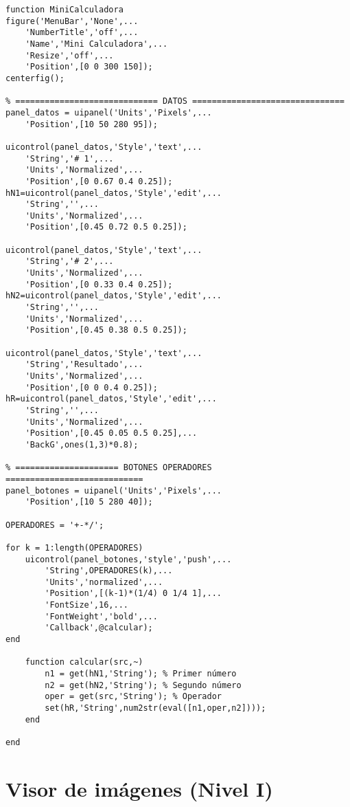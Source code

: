 \begin{verbatim}
function MiniCalculadora
figure('MenuBar','None',...
    'NumberTitle','off',...
    'Name','Mini Calculadora',...
    'Resize','off',...
    'Position',[0 0 300 150]);
centerfig();
 
% ============================= DATOS ===============================
panel_datos = uipanel('Units','Pixels',...
    'Position',[10 50 280 95]);
 
uicontrol(panel_datos,'Style','text',...
    'String','# 1',...
    'Units','Normalized',...
    'Position',[0 0.67 0.4 0.25]);
hN1=uicontrol(panel_datos,'Style','edit',...
    'String','',...
    'Units','Normalized',...
    'Position',[0.45 0.72 0.5 0.25]);
 
uicontrol(panel_datos,'Style','text',...
    'String','# 2',...
    'Units','Normalized',...
    'Position',[0 0.33 0.4 0.25]);
hN2=uicontrol(panel_datos,'Style','edit',...
    'String','',...
    'Units','Normalized',...
    'Position',[0.45 0.38 0.5 0.25]);
 
uicontrol(panel_datos,'Style','text',...
    'String','Resultado',...
    'Units','Normalized',...
    'Position',[0 0 0.4 0.25]);
hR=uicontrol(panel_datos,'Style','edit',...
    'String','',...
    'Units','Normalized',...
    'Position',[0.45 0.05 0.5 0.25],...
    'BackG',ones(1,3)*0.8);
 
% ===================== BOTONES OPERADORES ============================
panel_botones = uipanel('Units','Pixels',...
    'Position',[10 5 280 40]);
 
OPERADORES = '+-*/';
 
for k = 1:length(OPERADORES)
    uicontrol(panel_botones,'style','push',...
        'String',OPERADORES(k),...
        'Units','normalized',...
        'Position',[(k-1)*(1/4) 0 1/4 1],...
        'FontSize',16,...
        'FontWeight','bold',...
        'Callback',@calcular);
end
 
    function calcular(src,~)
        n1 = get(hN1,'String'); % Primer número
        n2 = get(hN2,'String'); % Segundo número
        oper = get(src,'String'); % Operador
        set(hR,'String',num2str(eval([n1,oper,n2])));
    end
 
end
\end{verbatim}

\section{Visor de imágenes (Nivel I)}


